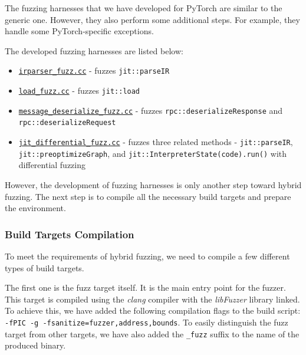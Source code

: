 The fuzzing harnesses that we have developed for PyTorch are similar to the generic one. However, they also perform some additional steps. For example, they handle some PyTorch-specific exceptions.

The developed fuzzing harnesses are listed below:

\begin{itemize}
    \item \href{https://github.com/ispras/oss-sydr-fuzz/blob/028e36875424aec00ef7375006c413a4be164197/projects/pytorch/irparser_fuzz.cc}{\texttt{irparser\_fuzz.cc}} - fuzzes \texttt{jit::parseIR}
    \item \href{https://github.com/ispras/oss-sydr-fuzz/blob/028e36875424aec00ef7375006c413a4be164197/projects/pytorch/load_fuzz.cc}{\texttt{load\_fuzz.cc}} - fuzzes \texttt{jit::load}
    \item \href{https://github.com/ispras/oss-sydr-fuzz/blob/028e36875424aec00ef7375006c413a4be164197/projects/pytorch/message_deserialize_fuzz.cc}{\texttt{message\_deserialize\_fuzz.cc}} - fuzzes \texttt{rpc::deserializeResponse} and \texttt{rpc::deserializeRequest}
    \item \href{https://github.com/ispras/oss-sydr-fuzz/blob/028e36875424aec00ef7375006c413a4be164197/projects/pytorch/jit_differential_fuzz.cc}{\texttt{jit\_differential\_fuzz.cc}} - fuzzes three related methods - \texttt{jit::parseIR}, \texttt{jit::preoptimizeGraph}, and \texttt{jit::InterpreterState(code).run()} with differential fuzzing
\end{itemize}

However, the development of fuzzing harnesses is only another step toward hybrid fuzzing. The next step is to compile all the necessary build targets and prepare the environment.

\subsubsection{Build Targets Compilation}

To meet the requirements of hybrid fuzzing, we need to compile a few different types of build targets.

The first one is the fuzz target itself. It is the main entry point for the fuzzer. This target is compiled using the \textit{clang} compiler with the \textit{libFuzzer} library linked. To achieve this, we have added the following compilation flags to the build script: \texttt{-fPIC -g -fsanitize=fuzzer,address,bounds}. To easily distinguish the fuzz target from other targets, we have also added the \texttt{\_fuzz} suffix to the name of the produced binary.

